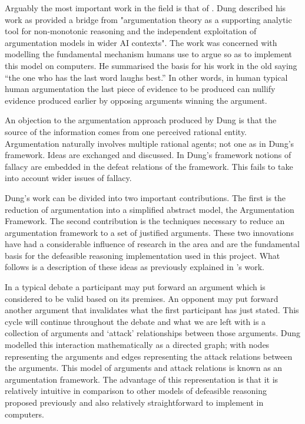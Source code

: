 Arguably the most important work in the field is that of \cite{dung1995acceptability}. Dung described his work as provided a bridge from "argumentation theory as a supporting analytic tool for non-monotonic reasoning and the independent exploitation of argumentation models in wider AI contexts". The work was concerned with modelling the fundamental mechanism humans use to argue so as to implement this model on computers. He summarised the basis for his work in the old saying “the one who has the last word laughs best.” In other words, in human typical human argumentation the last piece of evidence to be produced can nullify evidence produced earlier by opposing arguments winning the argument.

An objection to the argumentation approach produced by Dung is that the source of the information comes from one perceived rational entity. Argumentation naturally involves multiple rational agents; not one as in Dung's framework. Ideas are exchanged and discussed. In Dung's framework notions of fallacy are embedded in the defeat relations of the framework. This fails to take into account wider issues of fallacy.

Dung's work can be divided into two important contributions. The first is the reduction of argumentation into a simplified abstract model, the Argumentation Framework. The second contribution is the techniques necessary to reduce an argumentation framework to a set of justified arguments. These two innovations have had a considerable influence of research in the area and are the fundamental basis for the defeasible reasoning implementation used in this project. What follows is a description of these ideas as previously explained in \cite{dung1995acceptability}'s work.

In a typical debate a participant may put forward an argument which is considered to be valid based on its premises. An opponent may put forward another argument that invalidates what the first participant has just stated. This cycle will continue throughout the debate and what we are left with is a collection of arguments and `attack' relationships between those arguments. Dung modelled this interaction mathematically as a directed graph; with nodes representing the arguments and edges representing the attack relations between the arguments. This model of arguments and attack relations is known as an argumentation framework. The advantage of this representation is that it is relatively intuitive in comparison to other models of defeasible reasoning proposed previously and also relatively straightforward to implement in computers.

